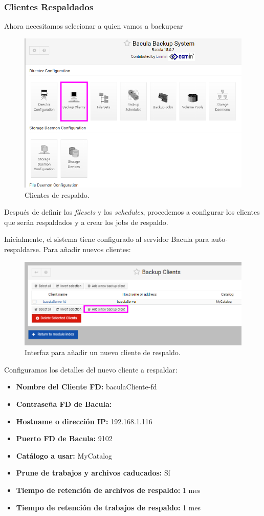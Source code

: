 \subsubsection{Clientes Respaldados}

Ahora necesitamos selecionar a quien vamos a backupear
\begin{figure}[H]
    \centering
    \includegraphics[width=0.5\linewidth]{instalacionBacula/asdasdas.png}
    \caption{Clientes de respaldo.}
\end{figure}

Después de definir los \textit{filesets} y los \textit{schedules}, procedemos a configurar los clientes que serán respaldados y a crear los jobs de respaldo.


Inicialmente, el sistema tiene configurado al servidor Bacula para auto-respaldarse. Para añadir nuevos clientes:

\begin{figure}[H]
    \centering
    \includegraphics[width=0.5\linewidth]{instalacionBacula/addnewbuckupclient.png}
    \caption{Interfaz para añadir un nuevo cliente de respaldo.}
\end{figure}

Configuramos los detalles del nuevo cliente a respaldar:

\begin{itemize}
    \item \textbf{Nombre del Cliente FD:} baculaCliente-fd
    \item \textbf{Contraseña FD de Bacula:} 
    \item \textbf{Hostname o dirección IP:} 192.168.1.116
    \item \textbf{Puerto FD de Bacula:} 9102
    \item \textbf{Catálogo a usar:} MyCatalog
    \item \textbf{Prune de trabajos y archivos caducados:} Sí
    \item \textbf{Tiempo de retención de archivos de respaldo:} 1 mes
    \item \textbf{Tiempo de retención de trabajos de respaldo:} 1 mes
\end{itemize}

